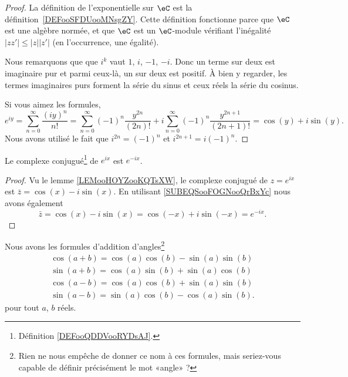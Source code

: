 \begin{proof}
	La définition de l'exponentielle sur \( \eC\) est la définition~\ref{DEFooSFDUooMNsgZY}. Cette définition fonctionne parce que \( \eC\) est une algèbre normée, et que \( \eC\) est un \( \eC\)-module vérifiant l'inégalité \(  | zz' |\leq | z | |z' | \) (en l'occurrence, une égalité).

	Nous remarquons que que \( i^k\) vaut \( 1\), \( i\), \( -1\), \( -i\). Donc un terme sur deux est imaginaire pur et parmi ceux-là, un sur deux est positif. À bien y regarder, les termes imaginaires purs forment la série du sinus et ceux réels la série du cosinus.

	Si vous aimez les formules,
	\begin{equation}
		e^{iy}=\sum_{n=0}^{\infty}\frac{ (iy)^n }{ n! }
		=\sum_{n=0}^{\infty}(-1)^n\frac{ y^{2n} }{ (2n)! }+i\sum_{n=0}^{\infty}(-1)^n\frac{ y^{2n+1} }{ (2n+1)! }
		=\cos(y)+i\sin(y).
	\end{equation}
	Nous avons utilisé le fait que \( i^{2n}=(-1)^n\) et \( i^{2n+1}=i(-1)^n\).
\end{proof}

\begin{corollary}       \label{CORooWZFIooDTCoRo}
	Le complexe conjugué\footnote{Définition \ref{DEFooQDDVooRYDsAJ}.} de \(  e^{ix}\) est \(  e^{-ix}\).
\end{corollary}

\begin{proof}
	Vu le lemme \ref{LEMooHOYZooKQTsXW}, le complexe conjugué de \(  z=e^{ix}\) est \(\bar z= \cos(x)-i\sin(x)\). En utilisant \eqref{SUBEQSooFOGNooQrBxYc} nous avons également
	\begin{equation}
		\bar z=\cos(x)-i\sin(x)=\cos(-x)+i\sin(-x)= e^{-ix}.
	\end{equation}
\end{proof}

\begin{lemma}       \label{LEMooJAWBooJGfZIL}
	Nous avons les formules d'addition d'angles\footnote{Rien ne nous empêche de donner ce nom à ces formules, mais seriez-vous capable de définir précisément le mot «angle» ?}
	\begin{subequations}        \label{SUBEQSooFSSMooHcYwRc}
		\begin{align}
			\cos(a+b)=\cos(a)\cos(b)-\sin(a)\sin(b) \label{EQooJYEMooQaOMib} \\
			\sin(a+b)=\cos(a)\sin(b)+\sin(a)\cos(b) \label{EQooECAUooQzckDv} \\
			\cos(a-b)=\cos(a)\cos(b)+\sin(a)\sin(b) \label{EQooCVZAooQfocya} \\
			\sin(a-b)=\sin(a)\cos(b)-\cos(a)\sin(b).
		\end{align}
	\end{subequations}
	pour tout \( a\), \( b\) réels.
\end{lemma}

